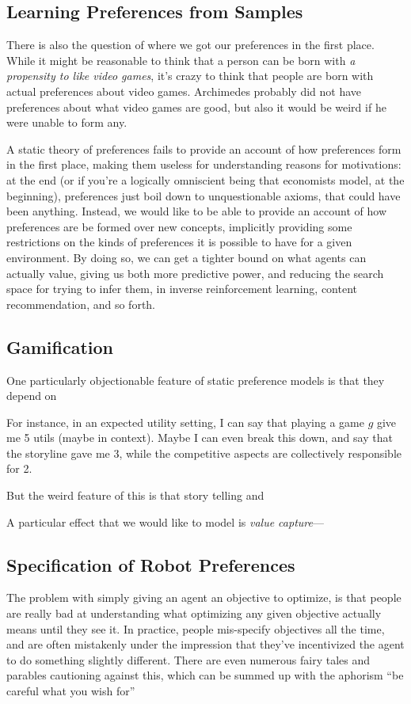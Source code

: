 \documentclass{article}
\begin{document}
	\subsection{Learning Preferences from Samples}
	There is also the question of where we got our preferences in the first place. While it might be reasonable to think that a person can be born with \textit{a propensity to like video games}, it's crazy to think that people are born with actual preferences about video games. Archimedes probably did not have preferences about what video games are good, but also it would be weird if he were unable to form any.
	
	A static theory of preferences fails to provide an account of how preferences form in the first place, making them useless for understanding reasons for motivations: at the end (or if you're a logically omniscient being that economists model, at the beginning), preferences just boil down to unquestionable axioms, that could have been anything. Instead, we would like to be able to provide an account of how preferences are be formed over new concepts, implicitly providing some restrictions on the kinds of preferences it is possible to have for a given environment. By doing so, we can get a tighter bound on what agents can actually value, giving us both more predictive power, and reducing the search space for trying to infer them, in inverse reinforcement learning, content recommendation, and so forth.
	
	\subsection{Gamification}
	One particularly objectionable feature of static preference models is that they depend on 
	
	For instance, in an expected utility setting, I can say that playing a game $g$ give me 5 utils (maybe in context). Maybe I can even break this down, and say that the storyline gave me 3, while the competitive aspects are collectively responsible for 2. 
	
	But the weird feature of this is that story telling and 
	
	A particular effect that we would like to model is \textit{value capture}---
	
	\subsection{Specification of Robot Preferences}
	The problem with simply giving an agent an objective to optimize, is that people are really bad at understanding what optimizing any given objective actually means until they see it. In practice, people mis-specify objectives all the time, and are often mistakenly under the impression that they've incentivized the agent to do something slightly different. There are even numerous fairy tales and parables cautioning against this, which can be summed up with the aphorism ``be careful what you wish for''
	
\end{document}
